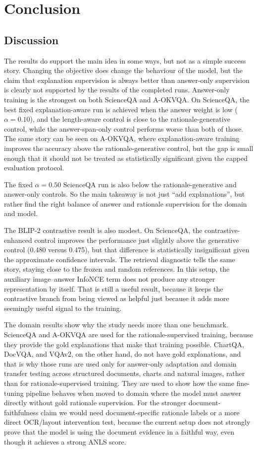 \chapter{Conclusion}
\section{Discussion}
The results do support the main idea in some ways, but not as a simple success story.
Changing the objective does change the behaviour of the model,
but the claim that explanation supervision is always better than answer-only supervision is clearly not supported by the results of the completed runs.
Answer-only training is the strongest on both ScienceQA and A-OKVQA.
On ScienceQA, the best fixed explanation-aware run is achieved when the answer weight is low ($\alpha=0.10$), and the length-aware control is close to the rationale-generative control, while the answer-span-only control performs worse than both of those.
The same story can be seen on A-OKVQA, where explanation-aware training improves the accuracy above the rationale-generative control,
but the gap is small enough that it should not be treated as statistically significant given the capped evaluation protocol.

The fixed $\alpha=0.50$ ScienceQA run is also below the rationale-generative and answer-only controls.
So the main takeaway is not just ``add explanations'', but rather find the right balance of answer and rationale supervision for the domain and model.

The BLIP-2 contrastive result is also modest.
On ScienceQA, the contrastive-enhanced control improves the performance just slightly above the generative control (0.480 versus 0.475),
but that difference is statistically insignificant given the approximate confidence intervals.
The retrieval diagnostic tells the same story, staying close to the frozen and random references.
In this setup, the auxiliary image--answer InfoNCE term does not produce any stronger representation by itself.
That is still a useful result, because it keeps the contrastive branch from being viewed as helpful just because it adds more seemingly useful signal to the training.

The domain results show why the study needs more than one benchmark.
ScienceQA and A-OKVQA are used for the rationale-supervised training, because they provide the gold explanations that make that training possible.
ChartQA, DocVQA, and VQAv2, on the other hand, do not have gold explanations, and that is why those runs are used only for answer-only adaptation 
and domain transfer testing across structured documents, charts and natural images, rather than for rationale-supervised training.
They are used to show how the same fine-tuning pipeline behaves when moved to domain where the model must answer directly without gold rationale supervision.
For the stronger document-faithfulness claim we would need document-specific rationale labels or a more direct OCR/layout intervention test, because the current setup does not strongly prove that the model is using the document evidence in a faithful way, even though it achieves a strong ANLS score.

